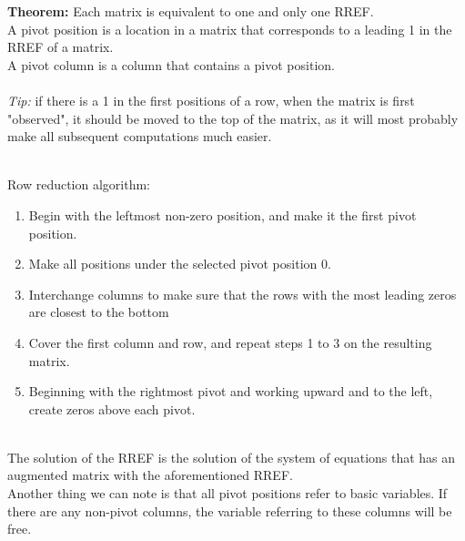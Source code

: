 \documentclass[nobib]{tufte-handout}
\begin{document}
\textbf{Theorem:} Each matrix is equivalent to one and only one RREF.\\
\quad A pivot position is a location in a matrix that corresponds to a leading 1 in the RREF of a matrix.\\
\quad A pivot column is a column that contains a pivot position.\\~\\
\textit{Tip:} if there is a 1 in the first positions of a row, when the matrix is first "observed", it should be moved to the top of the matrix, as it will most probably make all subsequent computations much easier. \\~\\
\begin{minipage}{\textwidth}
    Row reduction algorithm:
    \begin{enumerate}
        \item Begin with the leftmost non-zero position, and make it the first pivot position.
        \item Make all positions under the selected pivot position 0.
        \item Interchange columns to make sure that the rows with the most leading zeros are closest to the bottom
        \item Cover the first column and row, and repeat steps 1 to 3 on the resulting matrix.
        \item Beginning with the rightmost pivot and working upward and to the left, create zeros above each pivot.
    \end{enumerate}   
\end{minipage}
\vspace{0.2cm}\\
The solution of the RREF is the solution of the system of equations that has an augmented matrix with the aforementioned RREF.\\
\quad Another thing we can note is that all pivot positions refer to basic variables. If there are any non-pivot columns, the variable referring to these columns will be free.
\end{document}
